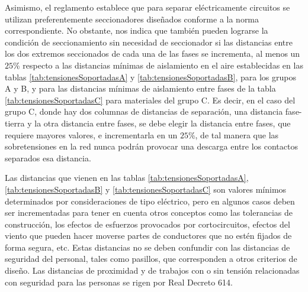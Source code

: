             Asimismo, el reglamento establece que para separar eléctricamente circuitos se utilizan preferentemente seccionadores diseñados conforme a la norma correspondiente. No obstante, nos indica que también pueden lograrse la condición de seccionamiento sin necesidad de seccionador si las distancias entre los dos extremos seccionados de cada una de las fases se incrementa, al menos un $25$\!\% respecto a las distancias mínimas de aislamiento en el aire establecidas en las tablas \ref{tab:tensionesSoportadasA} y \ref{tab:tensionesSoportadasB}, para los grupos A y B, y para las distancias mínimas de aislamiento entre fases de la tabla \ref{tab:tensionesSoportadasC} para materiales del grupo C. Es decir, en el caso del grupo C, donde hay dos columnas de distancias de separación, una distancia fase-tierra y la otra distancia entre fases, se debe elegir la distancia entre fases, que requiere mayores valores, e incrementarla en un $25$\!\%, de tal manera que las sobretensiones en la red nunca podrán provocar una descarga entre los contactos separados esa distancia.\newline

            Las distancias que vienen en las tablas \ref{tab:tensionesSoportadasA}, \ref{tab:tensionesSoportadasB} y \ref{tab:tensionesSoportadasC} son valores mínimos determinados por consideraciones de tipo eléctrico, pero en algunos casos deben ser incrementadas para tener en cuenta otros conceptos como las tolerancias de construcción, los efectos de esfuerzos provocados por cortocircuitos, efectos del viento que pueden hacer moverse partes de conductores que no estén fijados de forma segura, etc. Estas distancias no se deben confundir con las distancias de seguridad del personal, tales como pasillos, que corresponden a otros criterios de diseño. Las distancias de proximidad y de trabajos con o sin tensión relacionadas con seguridad para las personas se rigen por Real Decreto 614.\newline

